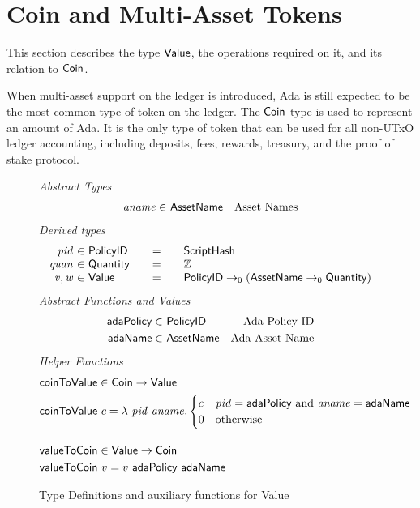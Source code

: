 \section{Coin and Multi-Asset Tokens}
\label{sec:coin-ma}

This section describes the type $\mathsf{Value}$, the operations required on
it, and its relation to $\mathsf{Coin}$.

When multi-asset support on the ledger is introduced, Ada is still expected to be
the most common type of token on the ledger.
The $\mathsf{Coin}$ type is used to represent an amount of Ada.
It is the only
type of token that can be used for all non-UTxO ledger accounting, including deposits,
fees, rewards, treasury, and the proof of stake protocol.

\begin{figure*}[t!]
  \emph{Abstract Types}
  \begin{align*}
    \mathit{aname} \in& ~\mathsf{AssetName} & \text{Asset Names}
  \end{align*}
  \emph{Derived types}
  \begin{equation*}
    \begin{array}{r@{~\in~}l@{\qquad=\qquad}lr}
      \var{pid} & \PolicyID & \ScriptHash \\
      \var{quan} & \Quantity & \Z \\
      \var{v}, \var{w} & \Value
      & \PolicyID \to_0 ( \AssetName \to_0 \Quantity )
    \end{array}
  \end{equation*}
  \emph{Abstract Functions and Values}
  \begin{align*}
    \mathsf{adaPolicy} \in& ~\mathsf{PolicyID} & \text{Ada Policy ID} \\
    \mathsf{adaName} \in& ~\mathsf{AssetName} & \text{Ada Asset Name}
  \end{align*}
  \emph{Helper Functions}
  \begin{align*}
    & \fun{coinToValue} \in \Coin\to \Value \\
    & \fun{coinToValue}~c = \lambda~\var{pid}~\var{aname}.
      \begin{cases}
        c & \var{pid} = \mathsf{adaPolicy}~\text{and}~\var{aname} = \mathsf{adaName} \\
        0 & \text{otherwise}
      \end{cases}
    \nextdef
    & \fun{valueToCoin} \in \Value \to \Coin \\
    & \fun{valueToCoin}~v = v~\mathsf{adaPolicy}~\mathsf{adaName}
  \end{align*}
  \caption{Type Definitions and auxiliary functions for Value}
  \label{fig:defs:value}
\end{figure*}


